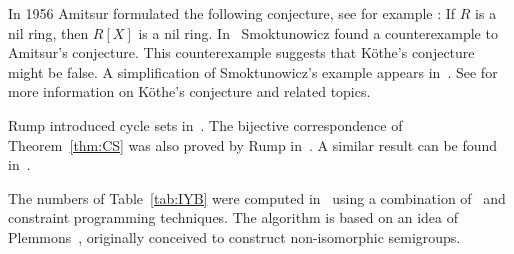 In 1956 Amitsur formulated the following conjecture, see for example
\cite{MR0347873}: If $R$ is a nil ring, then $R[X]$ is a nil ring. In~\cite{MR1793911} 
Smoktunowicz found a counterexample to Amitsur's conjecture. 
This counterexample suggests that K\"othe's conjecture might be false. 
A simplification of Smoktunowicz's example
appears in~\cite{MR3169522}. See \cite{MR1879880,MR2275597} for more
information on K\"othe's conjecture and related topics. 


Rump introduced cycle sets in~\cite{MR2132760}. The bijective correspondence of 
Theorem~\ref{thm:CS} was 
also proved by Rump in~\cite{MR2132760}. A similar result can be 
found in~\cite[Proposition 2.2]{MR1722951}. 

The numbers of Table~\ref{tab:IYB} were computed in~\cite{AMV}
using a combination of~\cite{GAP4} and constraint programming techniques. 
The algorithm is based on an idea of Plemmons~\cite{MR0258994}, originally 
conceived to construct non-isomorphic semigroups.  

